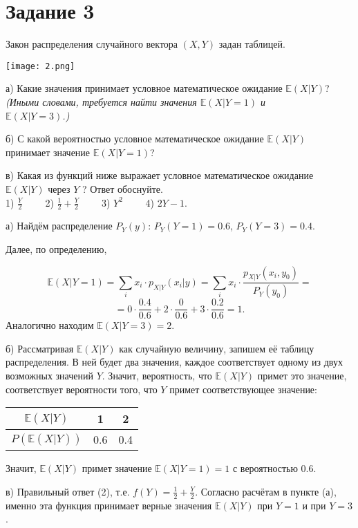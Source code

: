 \documentclass[a4paper,12pt]{article}
\newcommand{\ssolve}{\par\vspace{5pt}\noindent{\bf Решение. }\par}
\newcommand{\E}{\mathbb{E}}
\begin{document}
\section*{Задание 3}
Закон распределения случайного вектора
$(X, Y )$ задан таблицей. \par

\texttt{[image: 2.png]} \par

а) Какие значения принимает условное математическое ожидание $\mathbb{E}(X|Y )$? 
\textit{(Иными словами, требуется найти значения
$\mathbb{E}(X|Y = 1)$ и \\ $\mathbb{E}(X|Y = 3)$.)}
\par
б) С какой вероятностью условное математическое ожидание $\mathbb{E}(X|Y )$ принимает значение $\mathbb{E}(X|Y =1)$? \par
в) Какая из функций ниже выражает условное математическое ожидание $\mathbb{E}(X|Y )$ через $Y$ ? Ответ обоснуйте. \\
1) $\frac{Y}{2} \qquad$ 2) $\frac{1}{2} + \frac{Y}{2} \qquad$ 3) $Y^2 \qquad$ 4) $2Y-1$.

\ssolve
а) Найдём распределение $P_Y(y)$: $P_Y(Y=1)=0.6$, $P_Y(Y=3)=0.4$. \par
Далее, по определению, \par
$$\E(X|Y=1)=\sum_i x_i\cdot p_{X|Y}(x_i|y)=\sum_i x_i\cdot \frac{p_{X|Y}(x_i,y_0)}{P_Y(y_0)}=$$
$$=0\cdot \frac{0.4}{0.6}+2\cdot \frac{0}{0.6}+3 \cdot \frac{0.2}{0.6}=1.$$
Аналогично находим $\E(X|Y=3)=2$. \par
\vspace{5pt}
б) Рассматривая $\mathbb{E}(X|Y)$ как случайную величину, запишем её таблицу распределения. В ней будет два значения, каждое соответствует одному из двух возможных значений $Y$. Значит, вероятность, что $\mathbb{E}(X|Y)$ примет это значение, соответствует вероятности того, что $Y$ примет соответствующее значение: \par
\vspace{5pt}
\begin{tabular}{|c|c|c|}
\hline
$\mathbb{E}(X|Y)$&1&2 \\
\hline
$P(\mathbb{E}(X|Y))$&0.6&0.4\\
\hline 

\end{tabular} \par
\vspace{5pt}
Значит, $\mathbb{E}(X|Y)$ примет значение $\mathbb{E}(X|Y =1)=1$ с вероятностью $0.6$. \par
\vspace{5pt}
в) Правильный ответ (2), т.е.  $f(Y)=\frac{1}{2} + \frac{Y}{2}$. Согласно расчётам в пункте (а), именно эта функция принимает верные значения $\mathbb{E}(X|Y )$ при $Y=1$ и при $Y=3$.
\end{document}
